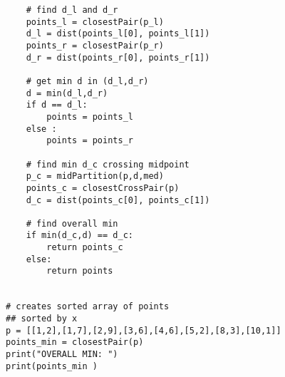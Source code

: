 \documentclass{article}
\begin{document}
\begin{enumerate}
\begin{itemize}
\begin{verbatim}
    # find d_l and d_r
    points_l = closestPair(p_l)
    d_l = dist(points_l[0], points_l[1])
    points_r = closestPair(p_r)
    d_r = dist(points_r[0], points_r[1])

    # get min d in (d_l,d_r)
    d = min(d_l,d_r)
    if d == d_l:
        points = points_l
    else :
        points = points_r

    # find min d_c crossing midpoint
    p_c = midPartition(p,d,med)
    points_c = closestCrossPair(p)
    d_c = dist(points_c[0], points_c[1])

    # find overall min
    if min(d_c,d) == d_c:
        return points_c
    else:
        return points


# creates sorted array of points
## sorted by x
p = [[1,2],[1,7],[2,9],[3,6],[4,6],[5,2],[8,3],[10,1]]
points_min = closestPair(p)
print("OVERALL MIN: ")
print(points_min )


\end{verbatim}
\end{itemize}
\end{enumerate}
\end{document}
